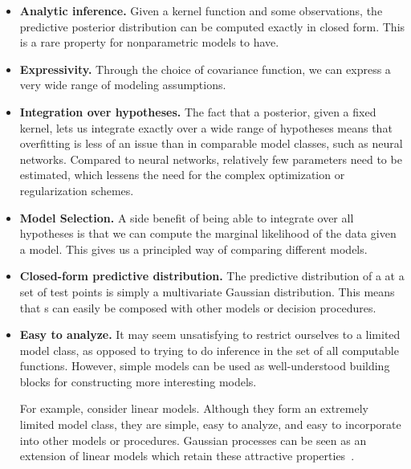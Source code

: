 \begin{itemize}

\item {\bf Analytic inference.}
Given a kernel function and some observations, the predictive posterior distribution can be computed exactly in closed form.
This is a rare property for nonparametric models to have.

\item {\bf Expressivity.}
Through the choice of covariance function, we can express a very wide range of modeling assumptions.

\item {\bf Integration over hypotheses.}
The fact that a \gp{} posterior, given a fixed kernel, lets us integrate exactly over a wide range of hypotheses means that overfitting is less of an issue than in comparable model classes, such as neural networks.
Compared to neural networks, relatively few parameters need to be estimated, which lessens the need for the complex optimization or regularization schemes.
%

\item {\bf Model Selection.}
A side benefit of being able to integrate over all hypotheses is that we can compute the marginal likelihood of the data given a model.
This gives us a principled way of comparing different models.

\item {\bf Closed-form predictive distribution.}
The predictive distribution of a \gp{} at a set of test points is simply a multivariate Gaussian distribution.
This means that \gp{}s can easily be composed with other models or decision procedures.

\item {\bf Easy to analyze.}
It may seem unsatisfying to restrict ourselves to a limited model class, as opposed to trying to do inference in the set of all computable functions.
However, simple models can be used as well-understood building blocks for constructing more interesting models. %

For example, consider linear models.
Although they form an extremely limited model class, they are simple, easy to analyze, and easy to incorporate into other models or procedures.
Gaussian processes can be seen as an extension of linear models which retain these attractive properties~\citep{rasmussen38gaussian}.


\end{itemize}




